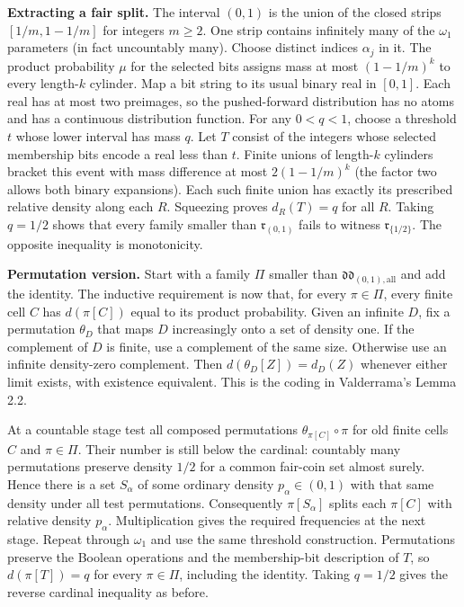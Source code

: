 \documentclass[11pt]{article}
\begin{document}
\textbf{Extracting a fair split.} The interval \((0,1)\) is the union of the closed strips \([1/m,1-1/m]\) for integers \(m\ge2\). One strip contains infinitely many of the \(\omega_1\) parameters (in fact uncountably many). Choose distinct indices \(\alpha_j\) in it. The product probability \(\mu\) for the selected bits assigns mass at most \((1-1/m)^k\) to every length-\(k\) cylinder. Map a bit string to its usual binary real in \([0,1]\). Each real has at most two preimages, so the pushed-forward distribution has no atoms and has a continuous distribution function. For any \(0<q<1\), choose a threshold \(t\) whose lower interval has mass \(q\). Let \(T\) consist of the integers whose selected membership bits encode a real less than \(t\). Finite unions of length-\(k\) cylinders bracket this event with mass difference at most \(2(1-1/m)^k\) (the factor two allows both binary expansions). Each such finite union has exactly its prescribed relative density along each \(R\). Squeezing proves \(d_R(T)=q\) for all \(R\). Taking \(q=1/2\) shows that every family smaller than \(\mathfrak r_{(0,1)}\) fails to witness \(\mathfrak r_{\{1/2\}}\). The opposite inequality is monotonicity.

\textbf{Permutation version.} Start with a family \(\Pi\) smaller than \(\mathfrak{dd}_{(0,1),\mathrm{all}}\) and add the identity. The inductive requirement is now that, for every \(\pi\in\Pi\), every finite cell \(C\) has \(d(\pi[C])\) equal to its product probability. Given an infinite \(D\), fix a permutation \(\theta_D\) that maps \(D\) increasingly onto a set of density one. If the complement of \(D\) is finite, use a complement of the same size. Otherwise use an infinite density-zero complement. Then \(d(\theta_D[Z])=d_D(Z)\) whenever either limit exists, with existence equivalent. This is the coding in Valderrama's Lemma 2.2.

At a countable stage test all composed permutations \(\theta_{\pi[C]}\circ\pi\) for old finite cells \(C\) and \(\pi\in\Pi\). Their number is still below the cardinal: countably many permutations preserve density \(1/2\) for a common fair-coin set almost surely. Hence there is a set \(S_\alpha\) of some ordinary density \(p_\alpha\in(0,1)\) with that same density under all test permutations. Consequently \(\pi[S_\alpha]\) splits each \(\pi[C]\) with relative density \(p_\alpha\). Multiplication gives the required frequencies at the next stage. Repeat through \(\omega_1\) and use the same threshold construction. Permutations preserve the Boolean operations and the membership-bit description of \(T\), so \(d(\pi[T])=q\) for every \(\pi\in\Pi\), including the identity. Taking \(q=1/2\) gives the reverse cardinal inequality as before.
\end{document}
